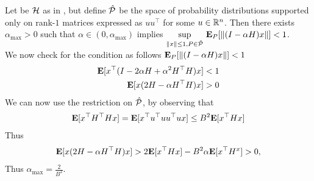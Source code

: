 \begin{example}\label{rankonestep}
Let be $\H$ as in , but define $\hat{\P}$ be the space of probability distributions supported only on rank-$1$ matrices expressed as $uu^\top$ for some $u\in \R^n$. Then there exists $\alpha_{\max}>0$ such that $\alpha\in(0,\alpha_{\max})$ implies $\us{\sup}{\norm{x}\leq 1,P\in\hat{\P}}\E_{P}[\norm{(I-\alpha H)x}]< 1$.\\
We now check for the condition as follows $\E_{P}[\norm{(I-\alpha H)x}]<1$
\begin{align}
\begin{split}
\E[x^\top(I-2\alpha H+\alpha^2 H^\top H)x]<1\\
\E[x(2 H- \alpha H^\top H)x]>0
\end{split}
\end{align}
We can now use the restriction on $\hat{\P}$, by observing that
\begin{align}
\E[x^\top H^\top Hx ]=\E[x^\top u^\top u u^\top u x]\leq B^2\E[x^\top H x]
\end{align}
Thus
\begin{align}
\begin{split}
\E[x(2 H- \alpha H^\top H)x]>2\E[x^\top H x]- B^2\alpha \E[x^\top H^x]>0,
\end{split}
\end{align}
Thus $\alpha_{\max}=\frac{2}{B^2}$.
\end{example}
